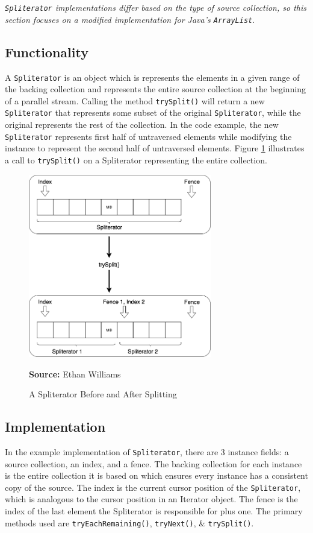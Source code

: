 \documentclass[oneside, 12pt]{article}
\newcommand{\source}[1]{\textbf{Source:} {#1} }
\begin{document}
{\itshape \verb|Spliterator| implementations differ based on the type of source collection, so this section focuses on a modified implementation for Java's \verb|ArrayList|}.

\subsection{Functionality}
A \verb|Spliterator| is an object which is represents the elements in a given range of the backing collection and represents the entire source collection at the beginning of a parallel stream. Calling the method \verb|trySplit()| will return a new \verb|Spliterator| that represents some subset of the original \verb|Spliterator|, while the original represents the rest of the collection. In the code example, the new \verb|Spliterator| represents first half of untraversed elements while modifying the instance to represent the second half of untraversed elements. Figure \ref{fig:split} illustrates a call to \verb|trySplit()| on a Spliterator representing the entire collection.

\begin{figure}[H]
\centering
\includegraphics[width=8cm]{images/spliterator_illustrated.png}
\caption{A Spliterator Before and After Splitting}
\source{Ethan Williams}
\label{fig:split}
\end{figure}

\subsection{Implementation}
In the example implementation of \verb|Spliterator|, there are 3 instance fields: a source collection, an index, and a fence. The backing collection for each instance is the entire collection it is based on which ensures every instance has a consistent copy of the source. The index is the current cursor position of the \verb|Spliterator|, which is analogous to the cursor position in an Iterator object. The fence is the index of the last element the Spliterator is responsible for plus one. The primary methods used are \verb|tryEachRemaining()|, \verb|tryNext()|, \& \verb|trySplit()|. 
\end{document}
